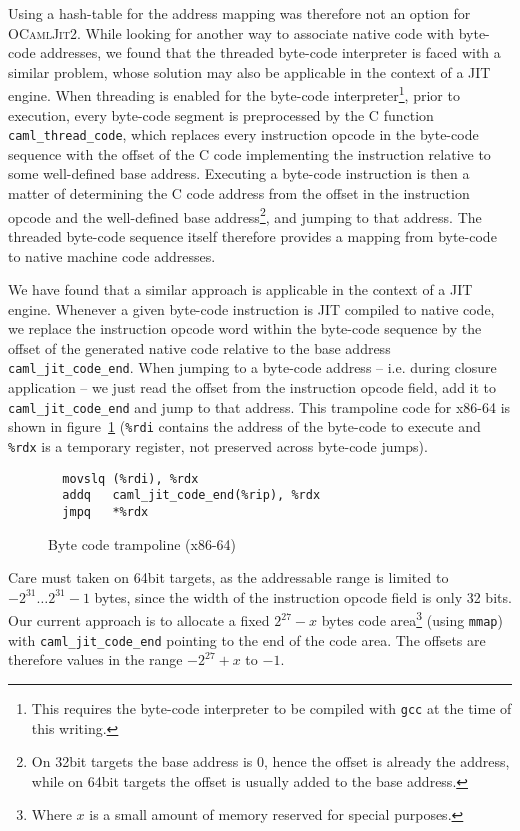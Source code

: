 \documentclass[10pt,a4paper,twocolumn]{article}
\begin{document}
Using a hash-table for the address mapping was therefore not an option for \textsc{OCamlJit2}. While
looking for another way to associate native code with byte-code addresses, we found that the threaded
byte-code interpreter is faced with a similar problem, whose solution may also be applicable in the
context of a JIT engine. When threading is enabled for the byte-code interpreter\footnote{This requires
the byte-code interpreter to be compiled with \texttt{gcc} at the time of this writing.}, prior to
execution, every byte-code segment is preprocessed by the C function \texttt{caml\_thread\_code},
which replaces every instruction opcode in the byte-code sequence with the offset of the C code
implementing the instruction relative to some well-defined base address. Executing a byte-code
instruction is then a matter of determining the C code address from the offset in the instruction
opcode and the well-defined base address\footnote{On 32bit targets the base address is $0$, hence the
offset is already the address, while on 64bit targets the offset is usually added to the base address.},
and jumping to that address. The threaded byte-code sequence itself therefore provides a mapping
from byte-code to native machine code addresses.

We have found that a similar approach is applicable in the context of a JIT engine. Whenever a
given byte-code instruction is JIT compiled to native code, we replace the instruction opcode word
within the byte-code sequence by the offset of the generated native code relative to the base address
\texttt{caml\_jit\_code\_end}. When jumping to a byte-code address -- i.e. during closure application -- we
just read the offset from the instruction opcode field, add it to \texttt{caml\_jit\_code\_end} and jump to that
address. This trampoline code for x86-64 is shown in figure~\ref{figure:Byte_code_trampoline_x86_64}
(\texttt{\%rdi} contains the address of the byte-code to execute and \texttt{\%rdx} is a temporary
register, not preserved across byte-code jumps).

\begin{figure}[ht]
  \centering
  \begin{verbatim}
  movslq (%rdi), %rdx
  addq   caml_jit_code_end(%rip), %rdx
  jmpq   *%rdx
\end{verbatim}
  \caption{Byte code trampoline (x86-64)}
  \label{figure:Byte_code_trampoline_x86_64}
\end{figure}

Care must taken on 64bit targets, as the addressable range is limited to $-2^{31} \ldots 2^{31}-1$ bytes,
since the width of the instruction opcode field is only 32 bits. Our current approach is to allocate
a fixed $2^{27}-x$ bytes code area\footnote{Where $x$ is a small amount of memory reserved for special purposes.}
(using \texttt{mmap}) with \texttt{caml\_jit\_code\_end} pointing to the end of the code area.
The offsets are therefore values in the range $-2^{27}+x$ to $-1$.
\end{document}
